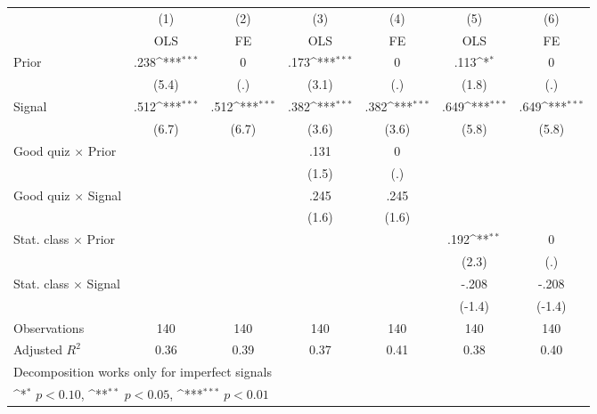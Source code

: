 {
\def\sym#1{\ifmmode^{#1}\else\(^{#1}\)\fi}
\begin{tabular}{l*{6}{c}}
\hline\hline
                &\multicolumn{1}{c}{(1)}&\multicolumn{1}{c}{(2)}&\multicolumn{1}{c}{(3)}&\multicolumn{1}{c}{(4)}&\multicolumn{1}{c}{(5)}&\multicolumn{1}{c}{(6)}\\
                &\multicolumn{1}{c}{OLS}&\multicolumn{1}{c}{FE}&\multicolumn{1}{c}{OLS}&\multicolumn{1}{c}{FE}&\multicolumn{1}{c}{OLS}&\multicolumn{1}{c}{FE}\\
\hline
Prior           &     .238\sym{***}&        0         &     .173\sym{***}&        0         &     .113\sym{*}  &        0         \\
                &    (5.4)         &      (.)         &    (3.1)         &      (.)         &    (1.8)         &      (.)         \\
Signal          &     .512\sym{***}&     .512\sym{***}&     .382\sym{***}&     .382\sym{***}&     .649\sym{***}&     .649\sym{***}\\
                &    (6.7)         &    (6.7)         &    (3.6)         &    (3.6)         &    (5.8)         &    (5.8)         \\
Good quiz $\times$ Prior&                  &                  &     .131         &        0         &                  &                  \\
                &                  &                  &    (1.5)         &      (.)         &                  &                  \\
Good quiz $\times$ Signal&                  &                  &     .245         &     .245         &                  &                  \\
                &                  &                  &    (1.6)         &    (1.6)         &                  &                  \\
Stat. class $\times$ Prior&                  &                  &                  &                  &     .192\sym{**} &        0         \\
                &                  &                  &                  &                  &    (2.3)         &      (.)         \\
Stat. class $\times$ Signal&                  &                  &                  &                  &    -.208         &    -.208         \\
                &                  &                  &                  &                  &   (-1.4)         &   (-1.4)         \\
\hline
Observations    &      140         &      140         &      140         &      140         &      140         &      140         \\
Adjusted \(R^{2}\)&     0.36         &     0.39         &     0.37         &     0.41         &     0.38         &     0.40         \\
\hline\hline
\multicolumn{7}{l}{\footnotesize Decomposition works only for imperfect signals}\\
\multicolumn{7}{l}{\footnotesize \sym{*} \(p<0.10\), \sym{**} \(p<0.05\), \sym{***} \(p<0.01\)}\\
\end{tabular}
}
